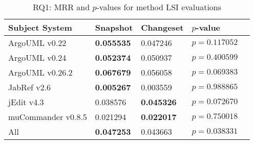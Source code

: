 
\begin{table}[t]
\renewcommand{\arraystretch}{1.3}
\footnotesize
\centering
\caption{RQ1: MRR and $p$-values for method LSI evaluations}
\begin{tabular}{l|ll|ll}
   \toprule
    Subject System & Snapshot        & Changeset       & $p$-value      \\
    \midrule

ArgoUML v0.22      & {\bf 0.055535 } & 0.047246        & $p = 0.117052$ \\
ArgoUML v0.24      & {\bf 0.052374 } & 0.050937        & $p = 0.400599$ \\
ArgoUML v0.26.2    & {\bf 0.067679 } & 0.056058        & $p = 0.069383$ \\
JabRef v2.6        & {\bf 0.005267 } & 0.003559        & $p = 0.988865$ \\
jEdit v4.3         & 0.038576        & {\bf 0.045326 } & $p = 0.072670$ \\
muCommander v0.8.5 & 0.021294        & {\bf 0.022017 } & $p = 0.750018$ \\
\midrule
All                & {\bf 0.047253 } & 0.043663        & $p = 0.038331$ \\

    \bottomrule
\end{tabular}
\label{table:rq1:method:lsi}
\end{table}

